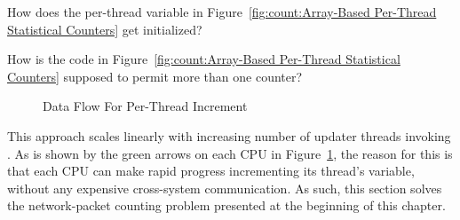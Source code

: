 \QuickQuiz{}
	How does the per-thread  variable in
	Figure~\ref{fig:count:Array-Based Per-Thread Statistical Counters}
	get initialized?
 \QuickQuizEnd

\QuickQuiz{}
	How is the code in
	Figure~\ref{fig:count:Array-Based Per-Thread Statistical Counters}
	supposed to permit more than one counter?
 \QuickQuizEnd

\begin{figure}[tb]
\begin{center}
\end{center}
\caption{Data Flow For Per-Thread Increment}
\label{fig:count:Data Flow For Per-Thread Increment}
\end{figure}

This approach scales linearly with increasing number of updater threads
invoking .
As is shown by the green arrows on each CPU in
Figure~\ref{fig:count:Data Flow For Per-Thread Increment},
the reason for this is that each CPU can make rapid progress incrementing
its thread's variable, without any expensive cross-system communication.
As such, this section solves the network-packet counting problem presented
at the beginning of this chapter.


